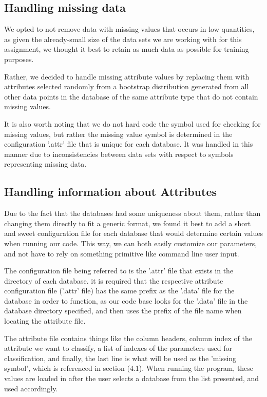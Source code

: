 \documentclass[twoside,11pt]{article}
\begin{document}
\subsection{Handling missing data}
 We opted to not remove data with missing values that occurs in low quantities, as given the already-small size of the data sets we are working with for this assignment, we thought it best to retain as much data as possible for training purposes.

Rather, we decided to handle missing attribute values by replacing them with attributes selected randomly from a bootstrap distribution generated from all other data points in the database of the same attribute type that do not contain missing values. 

It is also worth noting that we do not hard code the symbol used for checking for missing values, but rather the missing value symbol is determined in the configuration '.attr' file that is unique for each database. It was handled in this manner due to inconsistencies between data sets with respect to symbols representing missing data.

\subsection{Handling information about Attributes}
Due to the fact that the databases had some uniqueness about them, rather than changing them directly to fit a generic format, we found it best to add a short and sweet configuration file for each database that would determine certain values when running our code. This way, we can both easily customize our parameters, and not have to rely on something primitive like command line user input. 

The configuration file being referred to is the '.attr' file that exists in the directory of each database. it is required that the respective attribute configuration file ('.attr' file) has the same prefix as the '.data' file for the database in order to function, as our code base looks for the '.data' file in the database directory specified, and then uses the prefix of the file name when locating the attribute file. 

The attribute file contains things like the column headers, column index of the attribute we want to classify, a list of indexes of the parameters used for classification, and finally, the last line is what will be used as the 'missing symbol', which is referenced in section (4.1). When running the program, these values are loaded in after the user selects a database from the list presented, and used accordingly.
\end{document}
